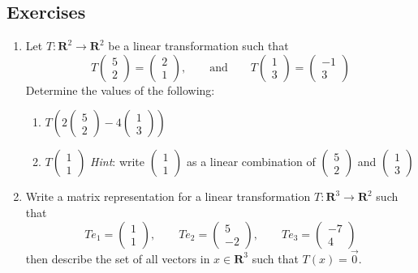 \documentclass[12pt]{article}
\numberwithin{equation}{subsection}
\numberwithin{figure}{subsection}
\theoremstyle{note}
\begin{document}
\subsection{Exercises}
\begin{enumerate}[label=\arabic*.]

	\item Let $T\colon \mathbf{R}^2\to \mathbf{R}^2$ be a linear transformation such that \[ T\begin{pmatrix} 5\\ 2\end{pmatrix} = \begin{pmatrix} 2 \\ 1\end{pmatrix}, \qquad \text{and} \qquad T\begin{pmatrix} 1 \\ 3 \end{pmatrix} =\begin{pmatrix} -1 \\ 3 \end{pmatrix}\] 
	Determine the values of the following: \begin{enumerate}
		\item $T\left( 2\begin{pmatrix} 5\\2\end{pmatrix} - 4\begin{pmatrix} 1 \\ 3\end{pmatrix} \right)$
		\item $T\begin{pmatrix} 1 \\ 1 \end{pmatrix}$ \qquad \textit{Hint}: write $\begin{pmatrix} 1 \\1\end{pmatrix}$ as a linear combination of $\begin{pmatrix} 5\\ 2\end{pmatrix}$ and $\begin{pmatrix} 1\\3\end{pmatrix}$
		\end{enumerate}
	\item Write a matrix representation for a linear transformation $T\colon \mathbf{R}^3\to\mathbf{R}^2$ such that \[ Te_1 = \begin{pmatrix} 1 \\ 1 \end{pmatrix}, \qquad Te_2 =\begin{pmatrix} 5 \\ -2 \end{pmatrix}, \qquad Te_3=\begin{pmatrix} -7 \\ 4\end{pmatrix}\] then describe the set of all vectors in $x\in \mathbf{R}^3$ such that $T(x)=\vec{0}$.

\end{enumerate}
\end{document}
